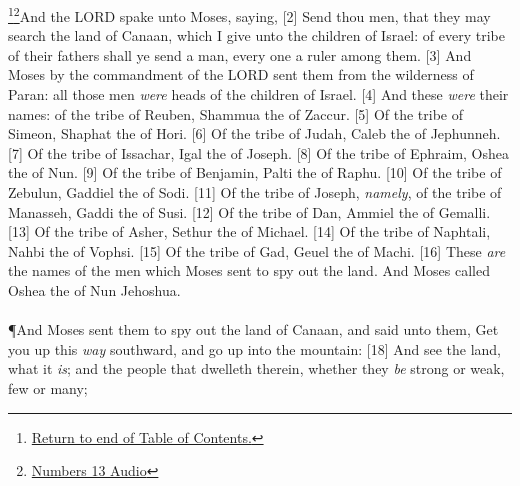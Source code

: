 \footnote{\textcolor[cmyk]{0.99998,1,0,0}{\hyperlink{TOC}{Return to end of Table of Contents.}}}\footnote{\href{https://audiobible.com/bible/numbers_13.html}{\textcolor[cmyk]{0.99998,1,0,0}{Numbers 13 Audio}}}\textcolor[cmyk]{0.99998,1,0,0}{And the LORD spake unto Moses, saying,}
[2] \textcolor[cmyk]{0.99998,1,0,0}{Send thou men, that they may search the land of Canaan, which I give unto the children of Israel: of every tribe of their fathers shall ye send a man, every one a ruler among them.}
[3] \textcolor[cmyk]{0.99998,1,0,0}{And Moses by the commandment of the LORD sent them from the wilderness of Paran: all those men \emph{were} heads of the children of Israel.}
[4] \textcolor[cmyk]{0.99998,1,0,0}{And these \emph{were} their names: of the tribe of Reuben, Shammua the  of Zaccur.}
[5] \textcolor[cmyk]{0.99998,1,0,0}{Of the tribe of Simeon, Shaphat the  of Hori.}
[6] \textcolor[cmyk]{0.99998,1,0,0}{Of the tribe of Judah, Caleb the  of Jephunneh.}
[7] \textcolor[cmyk]{0.99998,1,0,0}{Of the tribe of Issachar, Igal the  of Joseph.}
[8] \textcolor[cmyk]{0.99998,1,0,0}{Of the tribe of Ephraim, Oshea the  of Nun.}
[9] \textcolor[cmyk]{0.99998,1,0,0}{Of the tribe of Benjamin, Palti the  of Raphu.}
[10] \textcolor[cmyk]{0.99998,1,0,0}{Of the tribe of Zebulun, Gaddiel the  of Sodi.}
[11] \textcolor[cmyk]{0.99998,1,0,0}{Of the tribe of Joseph, \emph{namely}, of the tribe of Manasseh, Gaddi the  of Susi.}
[12] \textcolor[cmyk]{0.99998,1,0,0}{Of the tribe of Dan, Ammiel the  of Gemalli.}
[13] \textcolor[cmyk]{0.99998,1,0,0}{Of the tribe of Asher, Sethur the  of Michael.}
[14] \textcolor[cmyk]{0.99998,1,0,0}{Of the tribe of Naphtali, Nahbi the  of Vophsi.}
[15] \textcolor[cmyk]{0.99998,1,0,0}{Of the tribe of Gad, Geuel the  of Machi.}
[16] \textcolor[cmyk]{0.99998,1,0,0}{These \emph{are} the names of the men which Moses sent to spy out the land. And Moses called Oshea the  of Nun Jehoshua.}\\
\\
\P \textcolor[cmyk]{0.99998,1,0,0}{And Moses sent them to spy out the land of Canaan, and said unto them, Get you up this \emph{way} southward, and go up into the mountain:}
[18] \textcolor[cmyk]{0.99998,1,0,0}{And see the land, what it \emph{is}; and the people that dwelleth therein, whether they \emph{be} strong or weak, few or many;}

